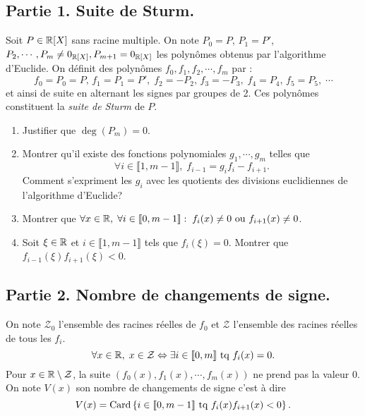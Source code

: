 
\subsection*{Partie 1. Suite de Sturm.} \noindent
Soit $P\in \mathbb{R}[X]$ sans racine multiple.\newline
On note $P_0 = P$, $P_1 = P'$, $P_2, \cdots, P_m\neq 0_{\mathbb{R}[X]}, P_{m+1} = 0_{\mathbb{R}[X]}$ les polynômes obtenus par l'algorithme d'Euclide. On définit des polynômes
$f_0, f_1, f_2, \cdots, f_m$ par : 
\[
  f_0 = P_0 = P,\, f_1 = P_1 = P', \; f_2 = -P_2,\, f_3 = -P_3, \; f_4 = P_4, \, f_5 = P_5,\; \cdots
\]
et ainsi de suite en alternant les signes par groupes de 2.\newline
Ces polynômes constituent la \emph{suite de Sturm} de $P$.
\begin{enumerate}
  \item Justifier que $\deg(P_m) = 0$.
  \item Montrer qu'il existe des fonctions polynomiales $g_1,\cdots, g_m$ telles que 
\[
  \forall i \in \llbracket 1,m-1 \rrbracket, \; f_{i-1} = g_i f_i - f_{i+1}.
\]
Comment s'expriment les $g_i$ avec les quotients des divisions euclidiennes de l'algorithme d'Euclide?
  \item Montrer que $\forall x \in \mathbb{R}, \; \forall i \in \llbracket 0, m-1\rrbracket: \; f_i(x) \neq 0 \text{ ou } f_{i+1}(x) \neq 0$.
  
  \item Soit $\xi \in \mathbb{R}$ et $i \in \llbracket 1,m-1\rrbracket$ tels que $f_i(\xi) = 0$. Montrer que $f_{i-1}(\xi)f_{i+1}(\xi) < 0$.
\end{enumerate}

\subsection*{Partie 2. Nombre de changements de signe.}\noindent
On note $\mathcal{Z}_0$ l'ensemble des racines réelles de $f_0$ et $\mathcal{Z}$ l'ensemble des racines réelles de tous les $f_i$.
\[
  \forall x \in \mathbb{R}, \; x\in \mathcal{Z} \Leftrightarrow \exists i \in \llbracket 0, m\rrbracket \text{ tq } f_i(x) = 0.
\]
Pour $x \in \mathbb{R} \setminus \mathcal{Z}$, la suite $(f_0(x), f_1(x), \cdots, f_m(x))$ ne prend pas la valeur $0$. On note $V(x)$ son nombre de changements de signe c'est à dire
\[
  V(x) = \operatorname{Card}\left\lbrace i \in \llbracket 0, m-1\rrbracket \text{ tq }f_i(x) f_{i+1}(x)< 0 \right\rbrace.
\]

